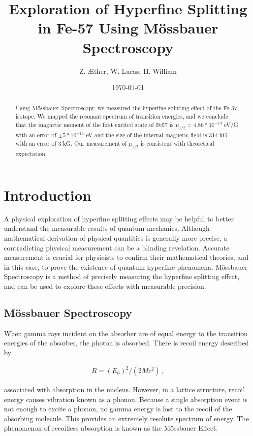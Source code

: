 \documentclass[letterpaper,12pt]{article}
\begin{document}
\title{Exploration of Hyperfine Splitting in Fe-57 Using Mössbauer Spectroscopy}
\author{Z. \AE ther, W. Lucas, H. William}
\date{\today}
\maketitle


\begin{abstract}
Using Mössbauer Spectroscopy, we measured the hyperfine splitting effect of the Fe-57 isotope. We mapped the resonant spectrum of transition energies, and we conclude that the magnetic moment of the first excited state of Fe57 is $\mu_{1/2}=4.86*10^{-13}$ eV/G with an error of $\pm5*10^{-15}$ eV and the size of the internal magnetic field is 314 kG with an error of 3 kG. Our measurement of $\mu_{1/2}$ is consistent with theoretical expectation. 
\end{abstract}

\pagebreak




\section{Introduction}

A physical exploration of hyperfine splitting effects may be helpful to better understand the measurable results of quantum mechanics. Although mathematical derivation of physical quantities is generally more precise, a contradicting physical measurement can be a blinding revelation. Accurate measurement is crucial for physicists to confirm their mathematical theories, and in this case, to prove the existence of quantum hyperfine phenomena. Mössbauer Spectroscopy is a method of precisely measuring the hyperfine splitting effect, and can be used to explore these effects with measurable precision.\


\subsection{Mössbauer Spectroscopy}

    When gamma rays incident on the absorber are of equal energy to the transition energies of the absorber, the photon is absorbed. There is recoil energy described by \

    \begin{eqnarray}
        R = (E_0)^2/ (2Mc^2) \label{eqn:recoil}\,,
    \end{eqnarray}

    associated with absorption in the nucleus. However, in a lattice structure, recoil energy causes vibration known as a phonon. Because a single absorption event is not enough to excite a phonon, no gamma energy is lost to the recoil of the absorbing molecule. This provides an extremely resolute spectrum of energy. The phenomenon of recoilless absorption is known as the Mössbauer Effect. 
\end{document}
